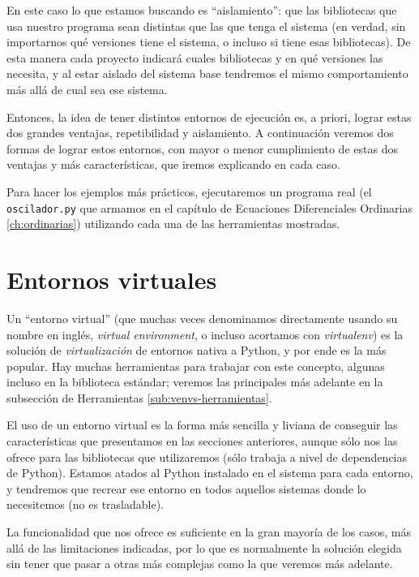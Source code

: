 En este caso lo que estamos buscando es ``aislamiento'': que las bibliotecas que usa nuestro programa sean distintas que las que tenga el sistema (en verdad, sin importarnos qué versiones tiene el sistema, o incluso si tiene esas bibliotecas). De esta manera cada proyecto indicará cuales bibliotecas y en qué versiones las necesita, y al estar aislado del sistema base tendremos el mismo comportamiento más allá de cual sea ese sistema.

Entonces, la idea de tener distintos entornos de ejecución es, a priori, lograr estas dos grandes ventajas, repetibilidad y aislamiento. A continuación veremos dos formas de lograr estos entornos, con mayor o menor cumplimiento de estas dos ventajas y más características, que iremos explicando en cada caso.

Para hacer los ejemplos más prácticos, ejecutaremos un programa real (el \texttt{oscilador.py} que armamos en el capítulo de Ecuaciones Diferenciales Ordinarias \ref{ch:ordinarias}) utilizando cada una de las herramientas mostradas.


\section{Entornos virtuales} \label{sec:virtualenvs}

Un ``entorno virtual'' (que muchas veces denominamos directamente usando su nombre en inglés, \textit{virtual environment}, o incluso acortamos con \textit{virtualenv}) es la solución de \textit{virtualización} de entornos nativa a Python, y por ende es la más popular. Hay muchas herramientas para trabajar con este concepto, algunas incluso en la biblioteca estándar; veremos las principales más adelante en la subsección de Herramientas \ref{sub:venvs-herramientas}.

El uso de un entorno virtual es la forma más sencilla y liviana de conseguir las características que presentamos en las secciones anteriores, aunque sólo nos las ofrece para las bibliotecas que utilizaremos (sólo trabaja a nivel de dependencias de Python). Estamos atados al Python instalado en el sistema para cada entorno, y tendremos que recrear ese entorno en todos aquellos sistemas donde lo necesitemos (no es trasladable).

La funcionalidad que nos ofrece es suficiente en la gran mayoría de los casos, más allá de las limitaciones indicadas, por lo que es normalmente la solución elegida sin tener que pasar a otras más complejas como la que veremos más adelante.


